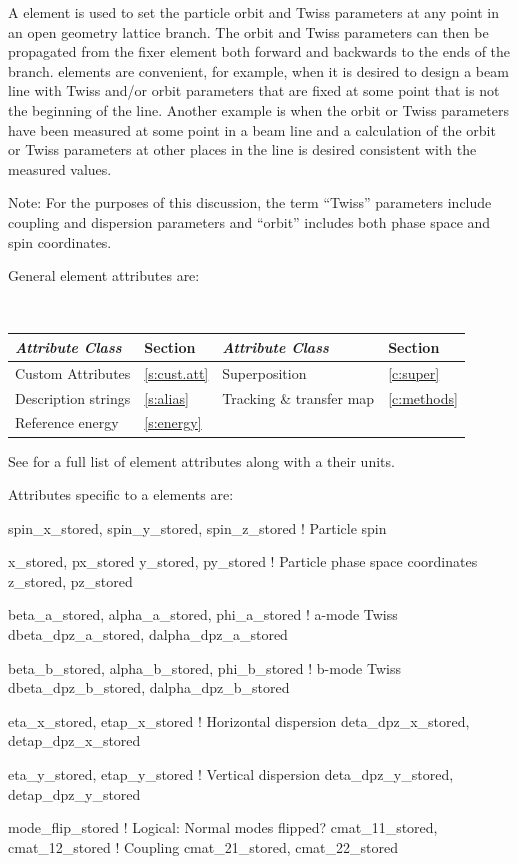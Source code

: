 A  element is used to set the particle orbit and Twiss parameters at any point in an open
geometry lattice branch. The orbit and Twiss parameters can then be propagated from the fixer
element both forward and backwards to the ends of the branch.  elements are convenient, for
example, when it is desired to design a beam line with Twiss and/or orbit parameters that are fixed
at some point that is not the beginning of the line. Another example is when the orbit or Twiss parameters
have been measured at some point in a beam line and a calculation of the orbit or Twiss parameters at
other places in the line is desired consistent with the measured values.

Note: For the purposes of this discussion, the term ``Twiss'' parameters include coupling and
dispersion parameters and ``orbit'' includes both phase space and spin coordinates.

General  element attributes are:
\begin{center}
\tt
\begin{tabular}{llll} \toprule
  {\sl Attribute Class}      & Section           & {\sl Attribute Class}      & Section         \\ \midrule
  Custom Attributes          & \ref{s:cust.att}  & Superposition              & \ref{c:super}   \\
  Description strings        & \ref{s:alias}     & Tracking \& transfer map   & \ref{c:methods} \\
  Reference energy           & \ref{s:energy}    &                            &                 \\
  \bottomrule
\end{tabular}
\end{center}
\toffset
See  for a full list of element attributes along with a their units.

Attributes specific to a  elements are:
\begin{example}
  spin_x_stored, spin_y_stored, spin_z_stored     ! Particle spin

  x_stored, px_stored
  y_stored, py_stored                             ! Particle phase space coordinates
  z_stored, pz_stored

  beta_a_stored, alpha_a_stored, phi_a_stored     ! a-mode Twiss
  dbeta_dpz_a_stored, dalpha_dpz_a_stored

  beta_b_stored, alpha_b_stored, phi_b_stored     ! b-mode Twiss
  dbeta_dpz_b_stored, dalpha_dpz_b_stored

  eta_x_stored, etap_x_stored                     ! Horizontal dispersion
  deta_dpz_x_stored, detap_dpz_x_stored

  eta_y_stored, etap_y_stored                     ! Vertical dispersion
  deta_dpz_y_stored, detap_dpz_y_stored

  mode_flip_stored                                ! Logical: Normal modes flipped? 
  cmat_11_stored, cmat_12_stored                  ! Coupling
  cmat_21_stored, cmat_22_stored
\end{example}

